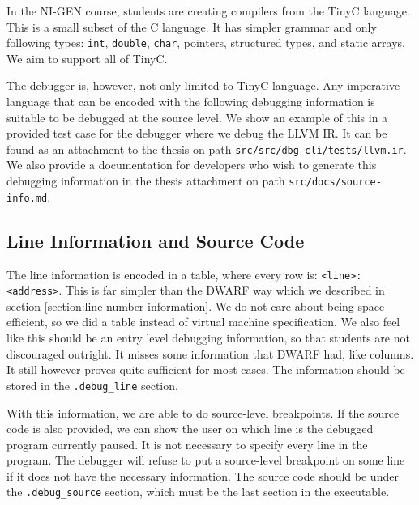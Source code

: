 In the NI-GEN course, students are creating compilers from the TinyC language.
This is a small subset of the C language. It has simpler grammar and only
following types: \texttt{int}, \texttt{double}, \texttt{char}, pointers,
structured types, and static arrays. We aim to support all of TinyC.

The debugger is, however, not only limited to TinyC language. Any imperative
language that can be encoded with the following debugging information is
suitable to be debugged at the source level. We show an example of this in a
provided test case for the debugger where we debug the LLVM IR. It can be found
as an attachment to the thesis on path \texttt{src/src/dbg-cli/tests/llvm.ir}.
We also provide a documentation for developers who wish to generate this
debugging information in the thesis attachment on path
\texttt{src/docs/source-info.md}.

\subsection{Line Information and Source Code}
The line information is encoded in a table, where every row is:
\texttt{<line>:<address>}. This is far simpler than the DWARF way which we
described in section \ref{section:line-number-information}. We do not care
about being space efficient, so we did a table instead of virtual machine
specification. We also feel like this should be an entry level debugging
information, so that students are not discouraged outright. It misses some
information that DWARF had, like columns. It still however proves quite
sufficient for most cases. The information should be stored in the
\verb|.debug_line| section.

With this information, we are able to do source-level breakpoints. If the
source code is also provided, we can show the user on which line is the
debugged program currently paused. It is not necessary to specify every line in
the program. The debugger will refuse to put a source-level breakpoint on some
line if it does not have the necessary information. The source code should be
under the \verb|.debug_source| section, which must be the last section in the
executable.

